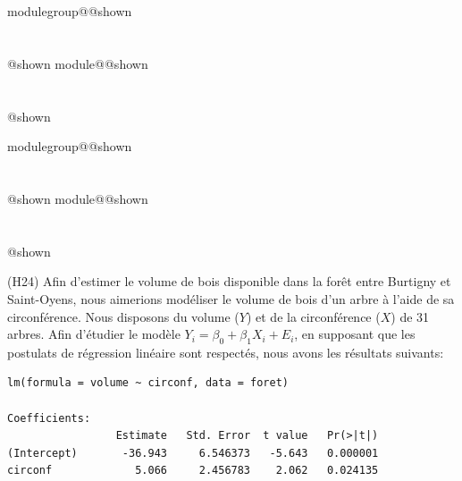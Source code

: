 \documentclass{Evaluation}
\makeatletter
\newcommand{\currentmodulekey}{}
\newcommand{\currentmoduletitle}{}
\newcommand{\currentgroupkey}{}
\newcommand{\currentgrouptitle}{}
\newcommand{\showmoduleifneeded}{%
  \ifx\currentgroupkey\empty\else
    \expandafter\ifx\csname modulegroup@\currentgroupkey @shown\endcsname\relax
      \section*{\currentgrouptitle}%
      \expandafter\gdef\csname modulegroup@\currentgroupkey @shown\endcsname{1}%
    \fi
  \fi
  \expandafter\ifx\csname module@\currentmodulekey @shown\endcsname\relax
    \section*{\currentmoduletitle}%
    \expandafter\gdef\csname module@\currentmodulekey @shown\endcsname{1}%
  \fi
}
\newenvironment{A23}{\showmoduleifneeded}{}
\newenvironment{H24}{\showmoduleifneeded}{}
\makeatother
\begin{document}
\begin{questions}
\begin{A23}
\begin{parts}
\begin{subparts}
\end{subparts}

\end{parts}
\end{A23}

\begin{H24}
\question
(H24)
Afin d'estimer le volume de bois disponible dans la forêt entre Burtigny et Saint-Oyens, nous aimerions modéliser le volume de bois d'un arbre à l'aide de sa circonférence. Nous disposons du volume ($Y$) et de la circonférence ($X$) de 31 arbres. Afin d'étudier le modèle $Y_i = \beta_0 + \beta_1 X_i + E_i$, en supposant que les postulats de régression linéaire sont respectés, nous avons les résultats suivants:

\begin{verbatim}
lm(formula = volume ~ circonf, data = foret)

Coefficients:
                 Estimate   Std. Error  t value   Pr(>|t|)
(Intercept)       -36.943     6.546373   -5.643   0.000001
circonf             5.066     2.456783    2.062   0.024135

\end{verbatim}

\end{H24}
\end{questions}
\end{document}
